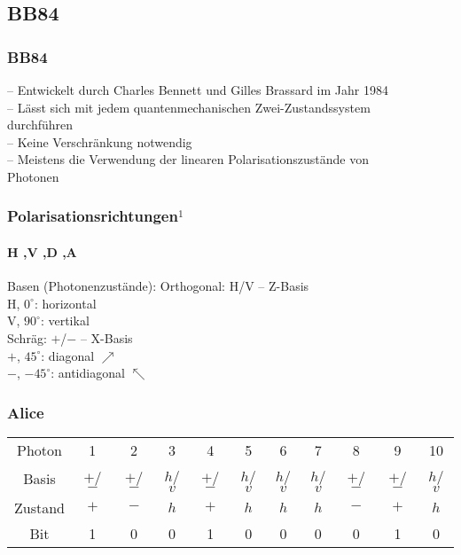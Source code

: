 \subsection{BB84}
\begin{frame}%
	\frametitle{BB84}
	-- Entwickelt durch Charles Bennett und Gilles Brassard im Jahr 1984\\
	-- Lässt sich mit jedem quantenmechanischen Zwei-Zustandssystem\\
		\hspace{0.5em} durchführen\\
	-- Keine Verschränkung notwendig\\
	-- Meistens die Verwendung der linearen Polarisationszustände von \\ 
		\hspace{0.5em} Photonen
\end{frame}

\begin{frame}
	\frametitle{Polarisationsrichtungen$^1$}
	\framesubtitle{H ,V ,D ,A}
	\begin{alertblock}{Basen (Photonenzust{\"a}nde):}
		Orthogonal: H/V – Z-Basis\\
		\hspace{0.5em}  H, $0^\circ$: horizontal \textrightarrow\\
		\hspace{0.5em}  V, $90^\circ$: vertikal  \textuparrow\\
		Schr{\"a}g: $+$/$-$ – X-Basis\\
		\hspace{0.5em}  $+$, $45^\circ$: diagonal $\nearrow$\\
		\hspace{0.5em}  $-$, $-45^\circ$: antidiagonal $\nwarrow$\\
	\end{alertblock}
\end{frame}

\begin{frame}
	\frametitle{Alice}
	\small
	\begin{tabular}{c|c|c|c|c|c|c|c|c|c|c}
		Photon & 1 & 2 & 3 & 4 & 5 & 6 & 7 & 8 & 9 & 10  \\
		Basis & $+$/$-$ & $+$/$-$ & $h$/$v$ & $+$/$-$ & $h$/$v$ & $h$/$v$ & $h$/$v$ & $+$/$-$ & $+$/$-$ & $h$/$v$ \\
		Zustand & $+$ & $-$ & $h$ & $+$ & $h$ & $h$ & $h$ & $-$ & $+$ & $h$\\
		Bit & 1 & 0 & 0 & 1 & 0 & 0 & 0 & 0 & 1 & 0 \\
	\end{tabular}
\end{frame}

